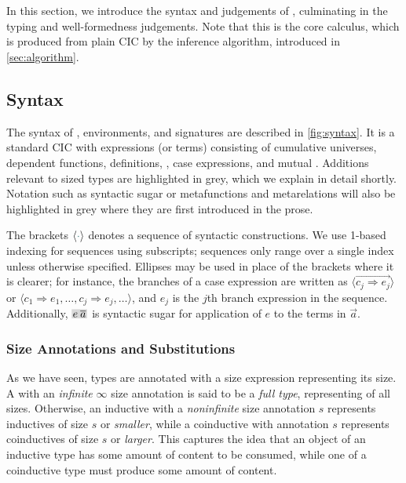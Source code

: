 \section{\titlelang}\label{sec:typing}
In this section, we introduce the syntax and judgements of \lang,
culminating in the typing and well-formedness judgements.
Note that this is the core calculus, which is produced from plain CIC by the inference algorithm,
introduced in \autoref{sec:algorithm}.

\subsection{Syntax}



The syntax of \lang, environments, and signatures are described in \autoref{fig:syntax}.
It is a standard CIC with expressions (or terms) consisting of cumulative universes, dependent functions, definitions, \coinductives, case expressions, and mutual \cofixpoints.
Additions relevant to sized types are highlighted in grey,
which we explain in detail shortly.
Notation such as syntactic sugar or metafunctions and metarelations will also be highlighted in grey
where they are first introduced in the prose.

The brackets $\seq{\ph}$ denotes a sequence of syntactic constructions.
We use 1-based indexing for sequences using subscripts;
sequences only range over a single index unless otherwise specified.
Ellipses may be used in place of the brackets where it is clearer;
for instance, the branches of a case expression are written as
$\langle \vec{c_j \Rightarrow e_j} \rangle$ or
$\langle c_1 \Rightarrow e_1, \dots, c_j \Rightarrow e_j, \dots \rangle$,
and $e_j$ is the $j$th branch expression in the sequence.
Additionally, $\new{\app{e}{\vec{a}}}$ is syntactic sugar for application of $e$ to the terms in $\vec{a}$.

\subsubsection{Size Annotations and Substitutions}

As we have seen, \coinductive types are annotated with a size expression representing its size.
A \coinductive with an \textit{infinite} $\infty$ size annotation is said to be a \textit{full type},
representing \coinductives of all sizes.
Otherwise, an inductive with a \textit{noninfinite} size annotation $s$ represents inductives of size $s$ or \emph{smaller},
while a coinductive with annotation $s$ represents coinductives of size $s$ or \emph{larger}.
This captures the idea that an object of an inductive type has some amount of content to be consumed,
while one of a coinductive type must produce some amount of content.

